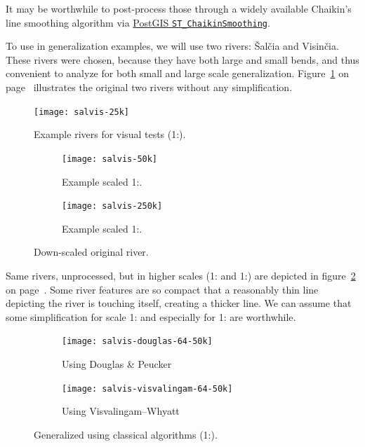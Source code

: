 \documentclass[a4paper]{article}
\newcommand{\onpage}[1]{\ref{#1} on page~\pageref{#1}}
\newcommand{\DP}{Douglas \& Peucker}
\newcommand{\VW}{Visvalingam--Whyatt}
\begin{document}
It may be worthwhile to post-process those through a widely available Chaikin's
line smoothing algorithm\cite{chaikin1974algorithm} via
\href{https://postgis.net/docs/ST_ChaikinSmoothing.html}{PostGIS
\texttt{ST\_ChaikinSmoothing}}.

To use in generalization examples, we will use two rivers: Šalčia and Visinčia.
These rivers were chosen, because they have both large and small bends, and
thus convenient to analyze for both small and large scale generalization.
Figure~\onpage{fig:salvis-25} illustrates the original two rivers without any
simplification.

\begin{figure}[h]
    \centering
    \texttt{[image: salvis-25k]}
    \caption{Example rivers for visual tests (1:{}).}
    \label{fig:salvis-25}
\end{figure}

\begin{figure}[h]
    \centering
    \begin{subfigure}[b]{.49\textwidth}
        \texttt{[image: salvis-50k]}
        \caption{Example scaled 1:.}
    \end{subfigure}
    \hfill
    \begin{subfigure}[b]{.49\textwidth}
        \centering
        \texttt{[image: salvis-250k]}
        \caption{Example scaled 1:.}
    \end{subfigure}
    \caption{Down-scaled original river.}
    \label{fig:salvis-50-250}
\end{figure}

Same rivers, unprocessed, but in higher scales (1: and
1:) are depicted in figure~\onpage{fig:salvis-50-250}. Some
river features are so compact that a reasonably thin line depicting the river
is touching itself, creating a thicker line. We can assume that some
simplification for scale 1: and especially for
1: are worthwhile.

\begin{figure}[h]
    \centering
    \begin{subfigure}[b]{.49\textwidth}
        \texttt{[image: salvis-douglas-64-50k]}
        \caption{Using {\DP}}
    \end{subfigure}
    \hfill
    \begin{subfigure}[b]{.49\textwidth}
        \texttt{[image: salvis-visvalingam-64-50k]}
        \caption{Using {\VW}}
    \end{subfigure}
    \caption{Generalized using classical algorithms (1:).}
    \label{fig:salvis-generalized-50k}
\end{figure}
\end{document}
